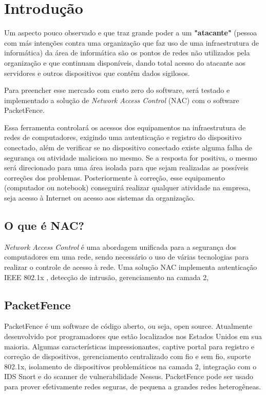 \documentclass[brazil, ruledheader, pnumromarab,normaltoc]{abnt}
\begin{document}
\chapter{Introdução}
Um aspecto pouco observado e que traz grande poder a um \textbf{"atacante"} (pessoa com más intenções contra uma organização que faz uso de uma infraestrutura de informática) da área de informática são os pontos de redes não utilizados pela organização e que continuam disponíveis, dando total acesso do atacante aos servidores e outros dispositivos que contêm dados sigilosos.
\par
Para preencher esse mercado com custo zero do software, será testado e implementado a solução de \textit{Network Access Control} (NAC) com o software PacketFence.
\par
Essa ferramenta controlará os acessos dos equipamentos na infraestrutura de redes de computadores, exigindo uma autenticação e registro do dispositivo conectado, além de verificar se no dispositivo conectado existe alguma falha de segurança ou atividade maliciosa no mesmo. Se a resposta for positiva, o mesmo será direcionado para uma área isolada para que sejam realizadas as possíveis correções dos problemas. Posteriormente à correção, esse equipamento (computador ou notebook) conseguirá realizar qualquer atividade na empresa, seja acesso à Internet ou acesso aos sistemas da organização.

\section{O que é NAC?}
\emph{Network Access Control} é uma abordagem unificada para a segurança dos computadores em uma rede, sendo necessário o uso de várias tecnologias para realizar o controle de acesso à rede. Uma solução NAC \cite{nac} implementa autenticação IEEE 802.1x \cite{802.1x}, detecção de intrusão, gerenciamento na camada 2, 


\section{PacketFence}
PacketFence \cite{url-pf} é um software de código aberto, ou seja, open source. Atualmente desenvolvido por programadores que estão localizados nos Estados Unidos em sua maioria. Algumas características impressionantes, captive portal para registro e correção de dispositivos, gerenciamento centralizado com fio e sem fio, suporte 802.1x, isolamento de dispositivos problemáticos na camada 2, integração com o IDS Snort e do scanner de vulnerabilidade Nessus. PacketFence pode ser usado para prover efetivamente redes seguras, de pequena a grandes redes heterogêneas.
\end{document}
